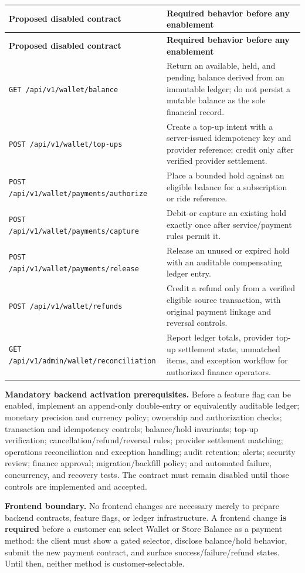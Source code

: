 \documentclass[11pt,a4paper]{article}
\newcommand{\code}[1]{\texttt{#1}}
\begin{document}
\begin{longtable}{p{} Z}
\toprule
\textbf{Proposed disabled contract} & \textbf{Required behavior before any enablement} \\
\midrule
\endfirsthead
\toprule
\textbf{Proposed disabled contract} & \textbf{Required behavior before any enablement} \\
\midrule
\endhead
\code{GET /api/v1/wallet/balance} & Return an available, held, and pending balance derived from an immutable ledger; do not persist a mutable balance as the sole financial record. \\
\code{POST /api/v1/wallet/top-ups} & Create a top-up intent with a server-issued idempotency key and provider reference; credit only after verified provider settlement. \\
\code{POST /api/v1/wallet/payments/authorize} & Place a bounded hold against an eligible balance for a subscription or ride reference. \\
\code{POST /api/v1/wallet/payments/capture} & Debit or capture an existing hold exactly once after service/payment rules permit it. \\
\code{POST /api/v1/wallet/payments/release} & Release an unused or expired hold with an auditable compensating ledger entry. \\
\code{POST /api/v1/wallet/refunds} & Credit a refund only from a verified eligible source transaction, with original payment linkage and reversal controls. \\
\code{GET /api/v1/admin/wallet/reconciliation} & Report ledger totals, provider top-up settlement state, unmatched items, and exception workflow for authorized finance operators. \\
\bottomrule
\end{longtable}

\textbf{Mandatory backend activation prerequisites.} Before a feature flag can be enabled, implement an append-only double-entry or equivalently auditable ledger; monetary precision and currency policy; ownership and authorization checks; transaction and idempotency controls; balance/hold invariants; top-up verification; cancellation/refund/reversal rules; provider settlement matching; operations reconciliation and exception handling; audit retention; alerts; security review; finance approval; migration/backfill policy; and automated failure, concurrency, and recovery tests. The contract must remain disabled until those controls are implemented and accepted.

\textbf{Frontend boundary.} No frontend changes are necessary merely to prepare backend contracts, feature flags, or ledger infrastructure. A frontend change \textbf{is required} before a customer can select Wallet or Store Balance as a payment method: the client must show a gated selector, disclose balance/hold behavior, submit the new payment contract, and surface success/failure/refund states. Until then, neither method is customer-selectable.
\end{document}
